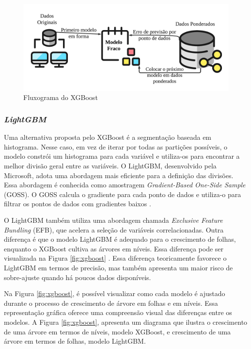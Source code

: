   \begin{figure}[H]
 	\centering
 	\caption{Fluxograma do XGBoost}
 	\label{fig:xgboos}
 	\includegraphics[width=\linewidth]{Modelos/Figuras/xgboos.pdf}
 \end{figure}
 
 \subsubsection{\textit{LightGBM}}
 
 Uma alternativa proposta pelo XGBoost é a segmentação baseada em histograma. Nesse caso, em vez de iterar por todas as partições possíveis, o modelo constrói um histograma para cada variável e utiliza-os para encontrar a melhor divisão geral entre as variáveis. O LightGBM, desenvolvido pela Microsoft, adota uma abordagem mais eficiente para a definição das divisões. Essa abordagem é conhecida como amostragem \textit{Gradient-Based One-Side Sample} (GOSS). O GOSS calcula o gradiente para cada ponto de dados e utiliza-o para filtrar os pontos de dados com gradientes baixos \cite{SUN2020101084}. 
 
 O LightGBM também utiliza uma abordagem chamada \textit{Exclusive Feature Bundling} (EFB), que acelera a seleção de variáveis correlacionadas. 
 Outra diferença é que o modelo LightGBM é adequado para o crescimento de folhas, enquanto o XGBoost cultiva as árvores em níveis. Essa diferença pode ser visualizada na Figura \ref{fig:xgboost} \cite{YE2023407}. Essa diferença teoricamente favorece o LightGBM em termos de precisão, mas também apresenta um maior risco de sobre-ajuste quando há poucos dados disponíveis. 
 
 Na Figura \ref{fig:xgboost}, é possível visualizar como cada modelo é ajustado durante o processo de crescimento de árvore em folhas e em níveis. Essa representação gráfica oferece uma compreensão visual das diferenças entre os modelos. A Figura \ref{fig:xgboost}, apresenta um diagrama que ilustra o crescimento de uma árvore em termos de níveis, modelo XGBoost, e crescimento de uma árvore em termos de folhas, modelo LightGBM.
 
